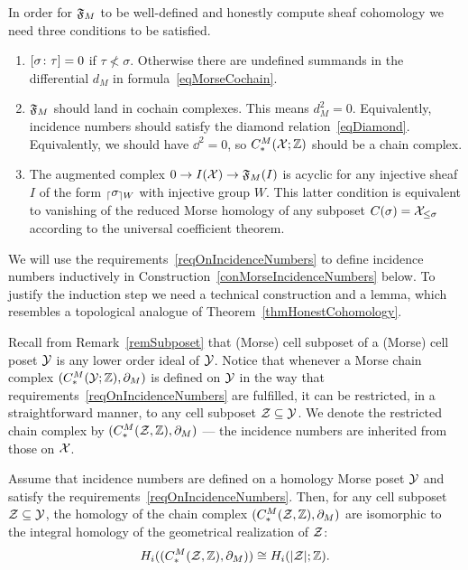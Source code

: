 In order for $\mathfrak{F}_M$ to be well-defined and honestly compute sheaf cohomology we need three conditions to be satisfied.

\begin{req}\label{reqOnIncidenceNumbers}
\begin{enumerate}
  \item $[\sigma\colon \tau]=0$ if $\tau\nless\sigma$. Otherwise there are undefined summands in the differential $d_M$ in formula~\eqref{eqMorseCochain}.
  \item $\mathfrak{F}_M$ should land in cochain complexes. This means $d_M^2=0$. Equivalently, incidence numbers should satisfy the diamond relation~\eqref{eqDiamond}. Equivalently, we should have $\dd^2=0$, so $C^M_*(\mathcal{X};\mathbb{Z})$ should be a chain complex.
  \item The augmented complex $0\to I(\mathcal{X})\to \mathfrak{F}_M(I)$ is acyclic for any injective sheaf $I$ of the form ${_{\lceil}\sigma_{\rceil W}}$ with injective group $W$. This latter condition is equivalent to vanishing of the reduced Morse homology of any subposet $C(\sigma)=\mathcal{X}_{\leq\sigma}$ according to the universal coefficient theorem.
\end{enumerate}
\end{req}

We will use the requirements~\ref{reqOnIncidenceNumbers} to define incidence numbers inductively in Construction~\ref{conMorseIncidenceNumbers} below. To justify the induction step we need a technical construction and a lemma, which resembles a topological analogue of Theorem~\ref{thmHonestCohomology}.

\begin{con}\label{conMorseChainSubposet}
Recall from Remark~\ref{remSubposet} that (Morse) cell subposet of a (Morse) cell poset $\mathcal{Y}$ is any lower order ideal of $\mathcal{Y}$. Notice that whenever a Morse chain complex $(C_*^M(\mathcal{Y};\mathbb{Z}), \partial_M)$ is defined on $\mathcal{Y}$ in the way that requirements~\ref{reqOnIncidenceNumbers} are fulfilled, it can be restricted, in a straightforward manner, to any cell subposet $\mathcal{Z}\subseteq\mathcal{Y}$. We denote the restricted chain complex by $(C^M_*(\mathcal{Z},\mathbb{Z}),\partial_M)$ --- the incidence numbers are inherited from those on $\mathcal{X}$.
\end{con}

\begin{lem}\label{lemHonestHomology}
Assume that incidence numbers are defined on a homology Morse poset $\mathcal{Y}$ and satisfy the requirements~\ref{reqOnIncidenceNumbers}. Then, for any cell subposet $\mathcal{Z}\subseteq\mathcal{Y}$, the homology of the chain complex $(C^M_*(\mathcal{Z},\mathbb{Z}),\partial_M)$ are isomorphic to the integral homology of the geometrical realization of $\mathcal{Z}$:
\[
H_i((C^M_*(\mathcal{Z},\mathbb{Z}),\partial_M))\cong H_i(|\mathcal{Z}|;\mathbb{Z}).
\]
\end{lem}

